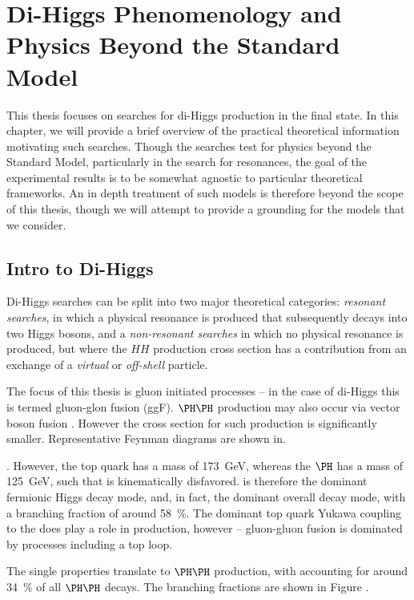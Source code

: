 \chapter{Di-Higgs Phenomenology and Physics Beyond the Standard Model}
This thesis focuses on searches for di-Higgs production in the \bbbb final state. In this chapter,
we will provide a brief overview of the practical theoretical information motivating such searches. 
Though the searches test for physics beyond the Standard Model, particularly in the search for 
resonances, the goal of the experimental results is to be somewhat agnostic to particular 
theoretical frameworks. An in depth treatment of such models is therefore beyond the scope 
of this thesis, though we will attempt to provide a grounding for the models that we consider.

\section{Intro to Di-Higgs}
Di-Higgs searches can be split into two major theoretical categories: \emph{resonant searches}, in which a physical resonance is produced that subsequently decays into two Higgs bosons, and a \emph{non-resonant searches} in which no physical resonance is produced, but where the $HH$ production cross section has a contribution from an exchange of a \emph{virtual} or \emph{off-shell} particle. 

The focus of this thesis is gluon initiated processes -- in the case of di-Higgs this is termed gluon-glon fusion
(ggF). $\higgs\higgs$ production may also occur via vector boson fusion . However the cross section for such production is significantly smaller. Representative Feynman diagrams are shown in.

. However, the top quark has a mass of \SI{173}{\GeV}, whereas the $\higgs$ has a mass of \SI{125}{\GeV}, such that \HepProcess{\higgs \to \Pqt\Paqt} is kinematically 
disfavored. \HepProcess{\higgs \to \Pqb\Paqb} is therefore the dominant fermionic Higgs decay mode, and, in fact, 
the dominant overall decay mode, with a branching fraction of around 58~\%. The dominant top quark Yukawa coupling to 
the \higgs does play a role in \higgs production, however -- gluon-gluon fusion is dominated by processes including 
a top loop.

The single \higgs properties translate to $\higgs\higgs$ production, with \HepProcess{\higgs\higgs \to \bbbb} accounting
for around 34~\% of all $\higgs\higgs$ decays. The \higgs\higgs branching fractions are shown in Figure .

